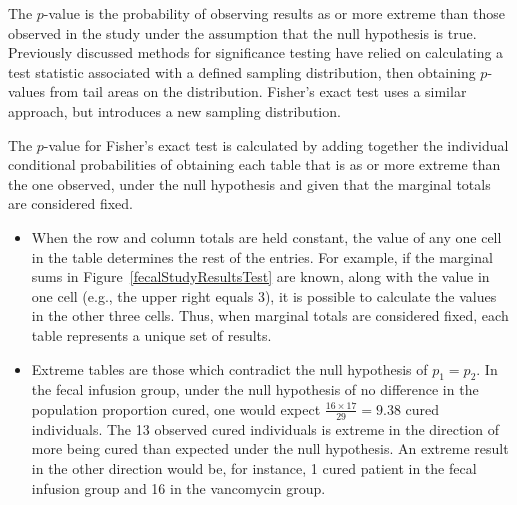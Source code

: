 \textD{\newpage}

The $p$-value is the probability of observing results as or more extreme than those observed in the study under  the assumption that the null hypothesis is true. Previously discussed methods for significance testing have relied on calculating a test statistic associated with a defined sampling distribution, then obtaining $p$-values from tail areas on the distribution.  Fisher's exact test uses a similar approach, but introduces a new sampling distribution.  

The $p$-value for Fisher's exact test is calculated by adding together the individual conditional probabilities of obtaining each table that is as or more extreme than the one observed, under the null hypothesis and given that the marginal totals are considered fixed.

\begin{itemize}
	
	\item When the row and column totals are held constant, the value of any one cell in the table determines the rest of the entries. For example, if the marginal sums in Figure~\ref{fecalStudyResultsTest} are known, along with the value in one cell (e.g., the upper right equals 3), it is possible to calculate the values in the other three cells. Thus, when marginal totals are considered fixed, each table represents a unique set of results.
	
	\item Extreme tables are those which contradict the null hypothesis of $p_1 = p_2$. In the fecal infusion group, under the null hypothesis of no difference in the population proportion cured, one would expect $\frac{16 \times 17}{29} = 9.38$ cured individuals. The 13 observed cured individuals is extreme in the direction of more being cured than expected under the null hypothesis. An extreme result in the other direction would be, for instance, 1 cured patient in the fecal infusion group and 16 in the vancomycin group.
	
\end{itemize}

